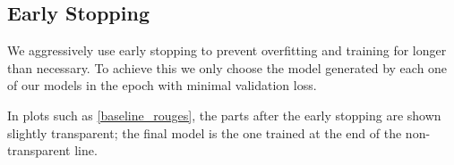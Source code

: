 \subsection{Early Stopping}
We aggressively use early stopping to prevent overfitting and training for longer than necessary.
To achieve this we only choose the model generated by each one of our models in the epoch with minimal validation loss.

In plots such as \cref{baseline_rouges}, the parts after the early stopping are shown slightly transparent; the final model is the one trained at the end of the non-transparent line.
